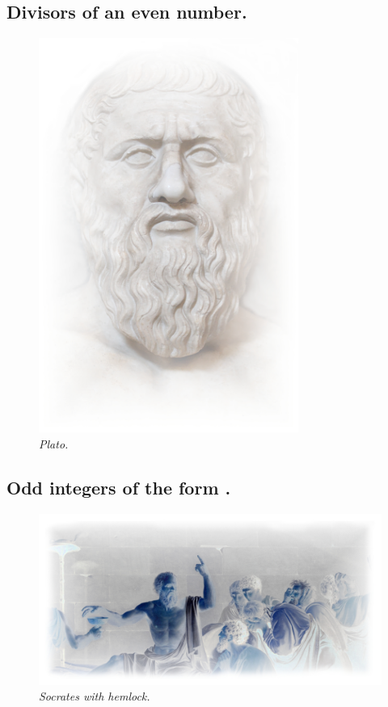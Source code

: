\documentclass[preview]{standalone}
\begin{document}
\subsection{Divisors of an even number.}

\begin{figure}[h!]
    \centering
    \includegraphics[width=8.5cm]{../resources/jpg/1.6.introduction.to.proofs/plato.jpg}
    \caption*{\emph{Plato.}}
\end{figure}
\pagebreak


\subsection{Odd integers of the form .}

\begin{figure}[h!]
    \centering
    \includegraphics[width=13.25cm]{../resources/jpg/1.6.introduction.to.proofs/socrates.jpg}
    \caption*{\emph{Socrates with hemlock.}}
\end{figure}
\end{document}
